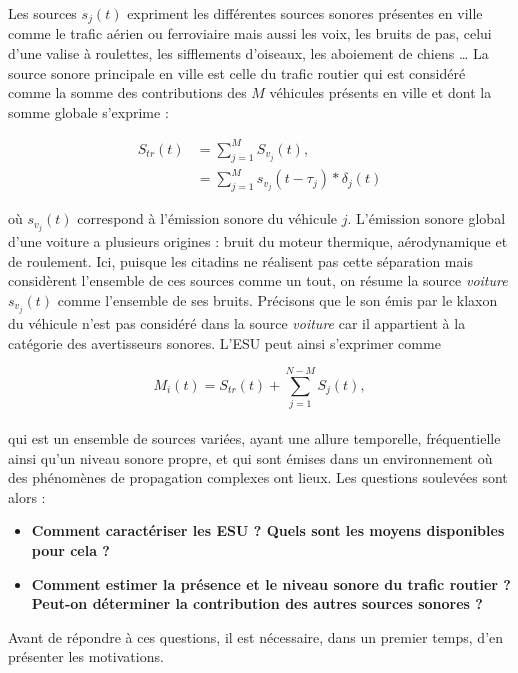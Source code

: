 Les sources $s_j(t)$ expriment les différentes sources sonores présentes en ville comme le trafic aérien ou ferroviaire mais aussi les voix, les bruits de pas, celui d'une valise à roulettes, les sifflements d'oiseaux, les aboiement de chiens \dots{} La source sonore principale en ville est celle du trafic routier qui est considéré comme la somme des contributions des $M$ véhicules présents en ville et dont la somme globale s'exprime :

\begin{subequations}
\begin{align}
S_{tr}(t) &= \sum_{j = 1}^M S_{v_j}(t),\\
 & = \sum_{j = 1}^M s_{v_j}(t-\tau_j) \ast \delta_{j}(t)
\end{align}
\end{subequations}

où $s_{v_j}(t)$ correspond à l'émission sonore du véhicule $j$. L'émission sonore global d'une voiture a plusieurs origines : bruit du moteur thermique, aérodynamique et de roulement. Ici, puisque les citadins ne réalisent pas cette séparation mais considèrent l'ensemble de ces sources comme un tout, on résume la source \textit{voiture} $s_{v_j}(t)$ comme l'ensemble de ses bruits. Précisons que le son émis par le klaxon du véhicule n'est pas considéré dans la source \textit{voiture} car il appartient à la catégorie des avertisseurs sonores.
L'ESU peut ainsi s'exprimer comme

\begin{equation}
M_i(t) = S_{tr}(t)+\sum_{j = 1}^{N-M}S_j(t),
\end{equation}
\\

qui est un ensemble de sources variées, ayant une allure temporelle, fréquentielle ainsi qu'un niveau sonore propre, et qui sont émises dans un environnement où des phénomènes de propagation complexes ont lieux. Les questions soulevées sont alors :

\begin{itemize}
\item \textbf{Comment caractériser les ESU ? Quels sont les moyens disponibles pour cela ?}
\item \textbf{Comment estimer la présence et le niveau sonore du trafic routier ? Peut-on déterminer la contribution des autres sources sonores ?}\\
\end{itemize}

Avant de répondre à ces questions, il est nécessaire, dans un premier temps, d'en présenter les motivations.

